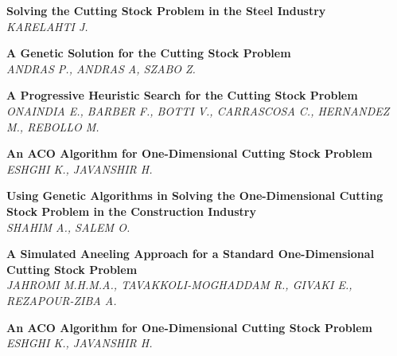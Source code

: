 \documentclass[letterpaper,11pt]{article}
\begin{document}
\begin{thebibliography}{99}
  
  \textbf{Solving the Cutting Stock Problem in the Steel Industry}\\
  \textit{KARELAHTI J.}

  \textbf{A Genetic Solution for the Cutting Stock Problem}\\
  \textit{ANDRAS P., ANDRAS A, SZABO Z.}

  \textbf{A Progressive Heuristic Search for the Cutting Stock Problem}\\
  \textit{ONAINDIA E., BARBER F., BOTTI V., CARRASCOSA C., HERNANDEZ M., REBOLLO M.}

  \textbf{An ACO Algorithm for One-Dimensional Cutting Stock Problem}\\
  \textit{ESHGHI K., JAVANSHIR H.}
  
  \textbf{Using Genetic Algorithms in Solving the One-Dimensional Cutting Stock Problem in the Construction Industry}\\
  \textit{SHAHIM A., SALEM O.}
  
  \textbf{A Simulated Aneeling Approach for a Standard One-Dimensional Cutting Stock Problem}\\
  \textit{JAHROMI M.H.M.A., TAVAKKOLI-MOGHADDAM R., GIVAKI E., REZAPOUR-ZIBA A.}
  
  \textbf{An ACO Algorithm for One-Dimensional Cutting Stock Problem}\\
  \textit{ESHGHI K., JAVANSHIR H.}

  \end{thebibliography}
  
\end{document}
